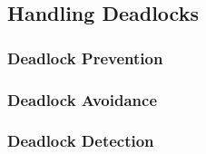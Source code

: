 \subsection{Handling Deadlocks}\label{subsec:Handling_Deadlocks}
\subsubsection{Deadlock Prevention}\label{subsubsec:Deadlock_Prevention}
\subsubsection{Deadlock Avoidance}\label{subsubsec:Deadlock_Avoidance}
\subsubsection{Deadlock Detection}\label{subsubsec:Deadlock_Detection}

